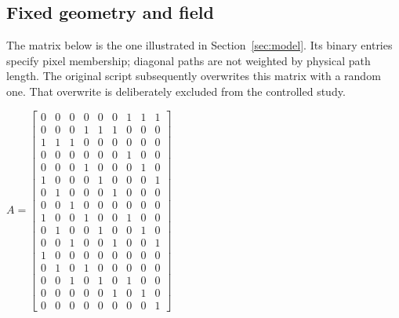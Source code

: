 \documentclass[11pt,a4paper]{article}
\renewcommand{\arraystretch}{1.25}
\begin{document}
\subsection*{Fixed geometry and field}
The matrix below is the one illustrated in Section~\ref{sec:model}. Its binary entries specify pixel membership; diagonal paths are not weighted by physical path length. The original script subsequently overwrites this matrix with a random one. That overwrite is deliberately excluded from the controlled study.
\begin{center}
\begin{minipage}[c]{0.56\linewidth}
\centering\small
\setlength{\arraycolsep}{3.5pt}
\renewcommand{\arraystretch}{1.02}
$A=\begin{bmatrix}
0&0&0&0&0&0&1&1&1\\
0&0&0&1&1&1&0&0&0\\
1&1&1&0&0&0&0&0&0\\
0&0&0&0&0&0&1&0&0\\
0&0&0&1&0&0&0&1&0\\
1&0&0&0&1&0&0&0&1\\
0&1&0&0&0&1&0&0&0\\
0&0&1&0&0&0&0&0&0\\
1&0&0&1&0&0&1&0&0\\
0&1&0&0&1&0&0&1&0\\
0&0&1&0&0&1&0&0&1\\
1&0&0&0&0&0&0&0&0\\
0&1&0&1&0&0&0&0&0\\
0&0&1&0&1&0&1&0&0\\
0&0&0&0&0&1&0&1&0\\
0&0&0&0&0&0&0&0&1
\end{bmatrix}$
\end{minipage}\hfill
\begin{minipage}[c]{0.40\linewidth}
\centering
{}
\end{minipage}
\end{center}
\end{document}
